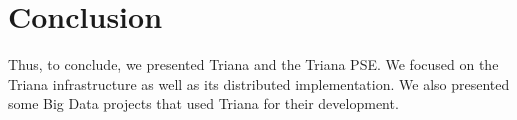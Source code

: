 \documentclass[9pt,twocolumn,twoside]{styles/osajnl}
\begin{document}
\section{Conclusion}

Thus, to conclude, we presented Triana and the Triana PSE.  We focused
on the Triana infrastructure as well as its distributed
implementation.  We also presented some Big Data projects that used
Triana for their development.



\end{document}
